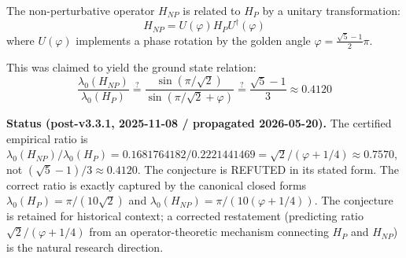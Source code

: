 \begin{conjecture}\label{conj:golden-modulation}
The non-perturbative operator $H_{NP}$ is related to $H_P$ by a unitary transformation:
\begin{equation}
H_{NP} = U(\varphi) H_P U^\dagger(\varphi)
\end{equation}
where $U(\varphi)$ implements a phase rotation by the golden angle $\varphi = \frac{\sqrt{5}-1}{2}\pi$.

This was claimed to yield the ground state relation:
\begin{equation}
\frac{\lambda_0(H_{NP})}{\lambda_0(H_P)} \stackrel{?}{=} \frac{\sin(\pi/\sqrt{2})}{\sin(\pi/\sqrt{2} + \varphi)} \stackrel{?}{=} \frac{\sqrt{5}-1}{3} \approx 0.4120
\end{equation}

\medskip
\noindent\textbf{Status (post-v3.3.1, 2025-11-08 / propagated 2026-05-20).} The certified empirical ratio is $\lambda_0(H_{NP})/\lambda_0(H_P) = 0.1681764182/0.2221441469 = \sqrt{2}/(\varphi + 1/4) \approx 0.7570$, not $(\sqrt{5}-1)/3 \approx 0.4120$. The conjecture is REFUTED in its stated form. The correct ratio is exactly captured by the canonical closed forms $\lambda_0(H_P) = \pi/(10\sqrt{2})$ and $\lambda_0(H_{NP}) = \pi/(10(\varphi+1/4))$. The conjecture is retained for historical context; a corrected restatement (predicting ratio $\sqrt{2}/(\varphi+1/4)$ from an operator-theoretic mechanism connecting $H_P$ and $H_{NP}$) is the natural research direction.
\end{conjecture}


